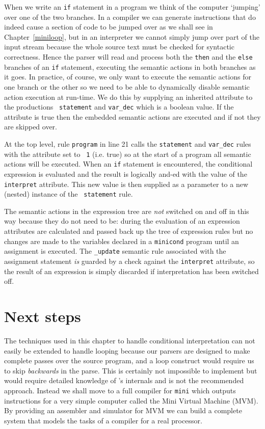 When we write an {\tt if} statement in a program we think of the
computer `jumping' over one of the two branches. In a compiler we can
generate instructions that do indeed cause a section of code to be
jumped over as we shall see in Chapter~\ref{miniloop}, but in an
interpreter we cannot simply jump over part of the input stream because
the whole source text must be checked for syntactic correctness. Hence
the parser will read and process both the {\tt then} and the {\tt else}
branches of an {\tt if} statement, executing the semantic actions in
both branches as it goes. In practice, of course, we only want to
execute the semantic actions for one branch or the other so we need to
be able to dynamically disable semantic action execution at run-time. We
do this by supplying an inherited attribute to the productions {\tt
statement} and \verb|var_dec| which is a boolean value. If the attribute
is true then the embedded semantic actions are executed and if not they
are skipped over.

At the top level, rule {\tt program} in line 21 calls the
\verb+statement+ and \verb+var_dec+ rules with the attribute set to {\tt
1} (i.e. {\sc true}) so at the start of a program all semantic actions
will be executed. When an {\tt if} statement is encountered, the 
conditional expression is evaluated and the result is logically {\sc
and}-ed with the value of the {\tt interpret} attribute. This new value
is then supplied as a parameter to a new (nested) instance of the {\tt
statement} rule.

The semantic actions in the expression tree are {\em not} switched on
and off in this way because they do not need to be: during the
evaluation of an expression attributes are calculated and passed back up
the tree of expression rules but no changes are made to the variables
declared in a {\tt minicond} program until an assignment is executed.
The \verb+_update+ semantic rule associated with the assignment
statement {\em is} guarded by a check against the {\tt interpret}
attribute, so the result of an  expression is simply discarded if
interpretation has been switched off.

\section{Next steps}
The techniques used in this chapter to handle conditional interpretation
can not easily be extended to handle looping because our parsers are
designed to make complete passes over the source program, and a loop
construct would require us to skip {\em backwards} in the parse. This
is certainly not impossible to implement but would require detailed
knowledge of \rdp's internals and is not the recommended approach.
Instead we shall move to a full compiler for {\tt mini} which outputs
instructions for a very simple computer called the Mini Virtual Machine
(MVM). By providing an assembler and simulator for MVM we can build a
complete system that models the tasks of a compiler for a real processor.

